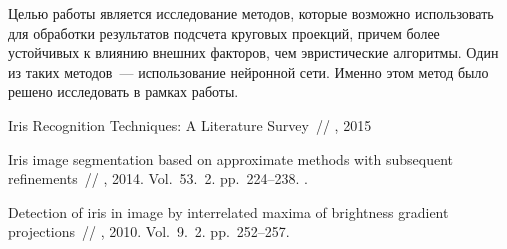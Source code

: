 \documentclass[12pt, twoside]{article}
\begin{document}
Целью работы является исследование методов, которые возможно использовать для обработки результатов подсчета круговых проекций, причем более устойчивых к влиянию внешних факторов, чем эвристические алгоритмы. Один из таких методов~--- использование нейронной сети. Именно этом метод было решено исследовать в рамках работы.


\begin{thebibliography}{99}


   Iris Recognition Techniques: A Literature Survey~//
    , 2015
	
   Iris image segmentation based on approximate methods
with subsequent refinements~//
    , 2014. Vol.~53. \No\,2. pp.~224--238.
	.
	
   Detection of iris in image by interrelated maxima of brightness gradient projections~//
    , 2010. Vol.~9. \No\,2. pp.~252--257.
	
 
 	
\end{thebibliography}

\end{document}
